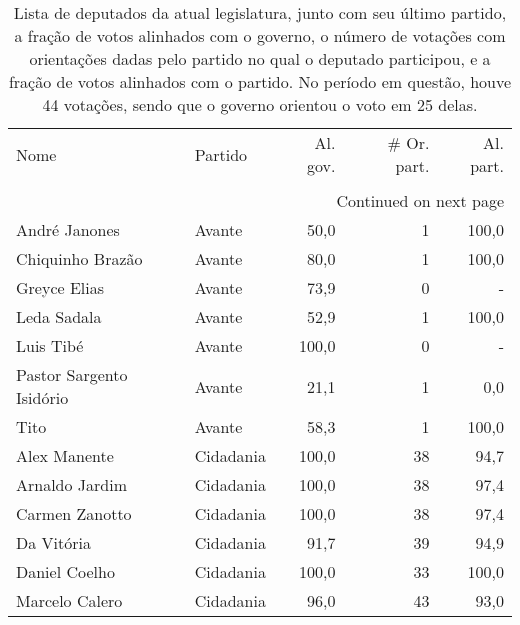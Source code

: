\begin{longtable}{llrrr}
  \caption{Lista de deputados da atual legislatura, junto com seu último partido, a fração de votos
  alinhados com o governo, o número de votações com orientações dadas pelo partido no qual o deputado participou,
  e a fração de votos alinhados com o partido. No período em questão, houve 44 votações, sendo que o
  governo orientou o voto em 25 delas.}\\
  \toprule
                                Nome &        Partido &  Al. gov. &  \# Or. part. &  Al. part. \\
                                &                &           &              &            \\
\midrule
\endhead
\midrule
\multicolumn{5}{r}{{Continued on next page}} \\
\midrule
\endfoot
\bottomrule
\endlastfoot
                       André Janones &         Avante &      50,0 &            1 &      100,0 \\
                    Chiquinho Brazão &         Avante &      80,0 &            1 &      100,0 \\
                        Greyce Elias &         Avante &      73,9 &            0 &          - \\
                         Leda Sadala &         Avante &      52,9 &            1 &      100,0 \\
                           Luis Tibé &         Avante &     100,0 &            0 &          - \\
            Pastor Sargento Isidório &         Avante &      21,1 &            1 &        0,0 \\
                                Tito &         Avante &      58,3 &            1 &      100,0 \\
                        Alex Manente &      Cidadania &     100,0 &           38 &       94,7 \\
                      Arnaldo Jardim &      Cidadania &     100,0 &           38 &       97,4 \\
                      Carmen Zanotto &      Cidadania &     100,0 &           38 &       97,4 \\
                          Da Vitória &      Cidadania &      91,7 &           39 &       94,9 \\
                       Daniel Coelho &      Cidadania &     100,0 &           33 &      100,0 \\
                      Marcelo Calero &      Cidadania &      96,0 &           43 &       93,0 \\

\end{longtable}
